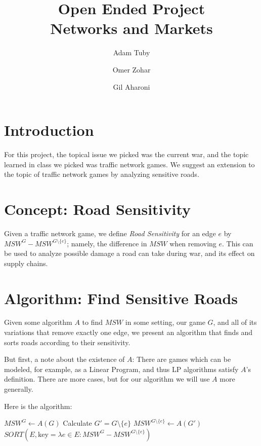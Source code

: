 \documentclass{article}
\title{
    Open Ended Project\\
    Networks and Markets
}
\author{
    Adam Tuby
    \and
    Omer Zohar
    \and
    Gil Aharoni
}
\begin{document}
\maketitle

\section{Introduction}

For this project, the topical issue we picked was the current war, and the topic learned in class we picked was traffic network games. We suggest an extension to the topic of traffic network games by analyzing sensitive roads.

\section{Concept: Road Sensitivity}

Given a traffic network game, we define \emph{Road Sensitivity} for an edge $e$ by $MSW^G - MSW^{G \setminus \{e\}}$; namely, the difference in $MSW$ when removing $e$. This can be used to analyze possible damage a road can take during war, and its effect on supply chains.

\section{Algorithm: Find Sensitive Roads}

Given some algorithm $A$ to find $MSW$ in some setting, our game $G$, and all of its variations that remove exactly one edge, we present an algorithm that finds and sorts roads according to their sensitivity.

But first, a note about the existence of $A$: There are games which can be modeled, for example, as a Linear Program, and thus LP algorithms satisfy $A$'s definition. There are more cases, but for our algorithm we will use $A$ more generally.

Here is the algorithm:

\begin{algorithm}[H]
\caption{FIND-ROAD-SENSITIVITY($G$)}
\begin{algorithmic}[1]
    \STATE $MSW^G \leftarrow A(G)$
        \STATE Calculate $G' = G \setminus \{e\}$
        \STATE $MSW^{G \setminus \{e\}} \leftarrow A(G')$
    \ENDFOR
    \RETURN $SORT(E, \text{key} = \lambda e \in E: MSW^G - MSW^{G \setminus \{e\}})$
\end{algorithmic}
\end{algorithm}
\end{document}
